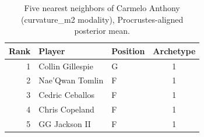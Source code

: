 \begin{table}[htbp]
  \centering\small
  \begin{tabular}{rllc}
    \toprule
    Rank & Player & Position & Archetype \\
    \midrule
    1 & Collin Gillespie & G & 1 \\
    2 & Nae'Qwan Tomlin & F & 1 \\
    3 & Cedric Ceballos & F & 1 \\
    4 & Chris Copeland & F & 1 \\
    5 & GG Jackson II & F & 1 \\
    \bottomrule
  \end{tabular}
  \caption{Five nearest neighbors of Carmelo Anthony (curvature_m2 modality), Procrustes-aligned posterior mean.}
  \label{tab:Carmelo_Anthony_neighbors_curvature_m2}
\end{table}

